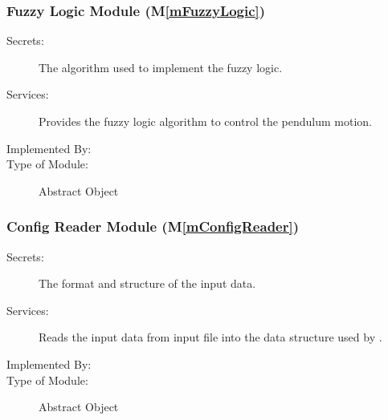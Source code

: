 \documentclass[12pt, titlepage]{article}
\newcommand{\mref}[1]{M\ref{#1}}
\begin{document}
\subsubsection{Fuzzy Logic Module (\mref{mFuzzyLogic})}

\begin{description}
\item[Secrets:] The algorithm used to implement the fuzzy logic.
\item[Services:] Provides the fuzzy logic algorithm to control the pendulum motion.
\item[Implemented By:] \progname{}
\item[Type of Module:] Abstract Object
\end{description}

\subsubsection{Config Reader Module (\mref{mConfigReader})}

\begin{description}
\item[Secrets:] The format and structure of the input data.
\item[Services:] Reads the input data from input file into 
                 the data structure used by \progname{}.
\item[Implemented By:] \progname{}
\item[Type of Module:] Abstract Object
\end{description}


\end{document}
